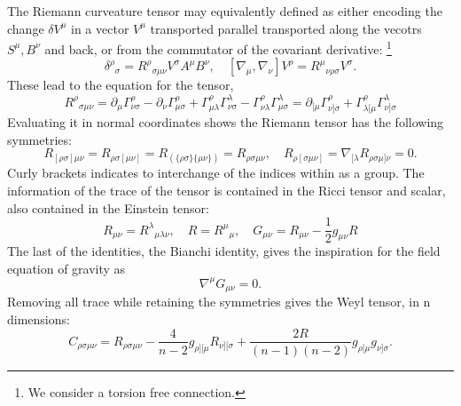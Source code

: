 The Riemann curveature tensor may equivalently defined as either encoding the change $\delta V^\mu$ in a vector $V^\mu$ transported parallel transported along the vecotrs $S^\mu, B^\nu$ and back, or from the commutator of the covariant derivative: \footnote{We consider a torsion free connection.}
\begin{equation*}
    \delta^\rho{}_\sigma = R^\rho{}_{\sigma \mu \nu} V^\sigma A^\mu B^\nu, \quad [\nabla_\mu, \nabla_\nu] V^\rho = R^\mu{}_{\nu \rho \sigma} V^\sigma.
\end{equation*}
These lead to the equation for the tensor,
\begin{equation*}
    R^\rho{}_{\sigma \mu \nu} 
    = \partial_\mu \Gamma^\rho_{\nu \sigma} - \partial_\nu \Gamma^\rho_{\mu \sigma} + \Gamma^\rho_{\mu \lambda} \Gamma^\lambda_{\nu \sigma} - \Gamma^\rho_{\nu \lambda} \Gamma^\lambda_{\mu \sigma} 
    = \partial_{[\mu} \Gamma^\rho_{\nu] \sigma} + \Gamma^\rho_{\lambda [\mu} \Gamma^\lambda_{\nu] \sigma}
\end{equation*}
Evaluating it in normal coordinates shows the Riemann tensor has the following symmetries:
\begin{equation*}
    R_{[\rho \sigma]\mu \nu} = R_{\rho \sigma[\mu \nu]} = R_{(\{\rho \sigma\}\{ \mu \nu\})} = R_{\rho \sigma \mu \nu}, \quad R_{\rho  [\sigma \mu \nu]} = \nabla_{[\lambda} R_{\rho  \sigma \mu ] \nu} = 0.
\end{equation*}
Curly brackets indicates to interchange of the indices within as a group. The information of the trace of the tensor is contained in the Ricci tensor and scalar, also contained in the Einstein tensor:
\begin{equation*}
    R_{\mu \nu} = R^\lambda{}_{\mu \lambda \nu}, \quad R = R^\mu{}_\mu, \quad G_{\mu \nu} = R_{\mu \nu} - \frac{1}{2} g_{\mu \nu} R
\end{equation*}
The last of the identities, the Bianchi identity, gives the inspiration for the field equation of gravity as
\begin{equation*}
    \nabla^\mu G_{\mu \nu} = 0.
\end{equation*}
Removing all trace while retaining the symmetries gives the Weyl tensor, in n dimensions:
\begin{equation*}
    C_{\rho \sigma \mu \nu} = R_{\rho \sigma \mu \nu} - \frac{4}{n - 2} g_{\rho][\mu}R_{\nu][\sigma} + \frac{2 R}{(n - 1)(n - 2)} g_{\rho [\mu}g_{\nu]\sigma}.
\end{equation*}









